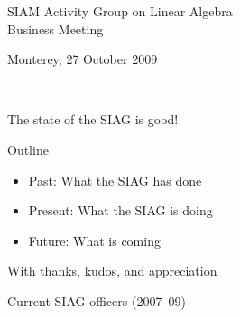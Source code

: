 \documentclass[]{seminar}
\begin{document}
{\sf
\thispagestyle{empty}


\begin{slide}

\begin{center}
{\color{blue}
\vspace{4mm}
{\Large SIAM Activity Group on Linear Algebra
} }
\\
\vspace{3mm}
{\color{blue}
{\Large Business Meeting}
}
\end{center}


\vspace{5mm}
\begin{center}
Monterey, 27 October 2009
\end{center}



\date{}

\end{slide}


\begin{slide}

~~

\begin{center}
{\color{blue}
{\Large
The state of the SIAG is good! }
}
\end{center}


\end{slide}
\begin{slide}

\begin{center}
{\color{blue}
Outline
}
\end{center}
\vspace*{8mm}

\begin{itemize}
\item {\color{red} Past:} What the SIAG has done
\item {\color{red} Present:} What the SIAG is doing
\item {\color{red} Future:} What is coming
\end{itemize}

\vspace*{2mm} 

With thanks, kudos, and appreciation

\end{slide}
\begin{slide}


\vspace*{2mm}
\begin{center}
{\color{blue}
Current SIAG officers (2007--09)
}
\end{center}


\end{slide}}
\end{document}
